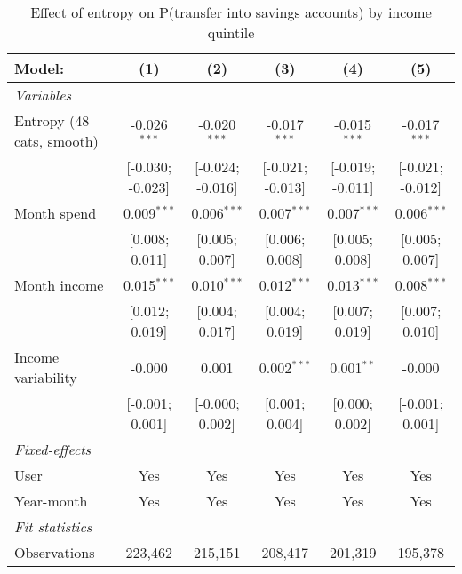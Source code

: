 
\begin{table}[htbp]
   \centering
   \tiny
   \begin{threeparttable}[b]
      \caption{\label{tab:reg_has_inflows_entropy_tag_spend_sz_quint} Effect of entropy on P(transfer into savings accounts) by income quintile}
      \begin{tabular}{lccccc}
         \tabularnewline \midrule \midrule
         Model:                    & (1)              & (2)              & (3)              & (4)              & (5)\\  
         \midrule
         \emph{Variables}\\
         Entropy (48 cats, smooth) & -0.026$^{***}$   & -0.020$^{***}$   & -0.017$^{***}$   & -0.015$^{***}$   & -0.017$^{***}$\\   
                                   & [-0.030; -0.023] & [-0.024; -0.016] & [-0.021; -0.013] & [-0.019; -0.011] & [-0.021; -0.012]\\   
         Month spend               & 0.009$^{***}$    & 0.006$^{***}$    & 0.007$^{***}$    & 0.007$^{***}$    & 0.006$^{***}$\\   
                                   & [0.008; 0.011]   & [0.005; 0.007]   & [0.006; 0.008]   & [0.005; 0.008]   & [0.005; 0.007]\\   
         Month income              & 0.015$^{***}$    & 0.010$^{***}$    & 0.012$^{***}$    & 0.013$^{***}$    & 0.008$^{***}$\\   
                                   & [0.012; 0.019]   & [0.004; 0.017]   & [0.004; 0.019]   & [0.007; 0.019]   & [0.007; 0.010]\\   
         Income variability        & -0.000           & 0.001            & 0.002$^{***}$    & 0.001$^{**}$     & -0.000\\   
                                   & [-0.001; 0.001]  & [-0.000; 0.002]  & [0.001; 0.004]   & [0.000; 0.002]   & [-0.001; 0.001]\\   
         \midrule
         \emph{Fixed-effects}\\
         User                      & Yes              & Yes              & Yes              & Yes              & Yes\\  
         Year-month                & Yes              & Yes              & Yes              & Yes              & Yes\\  
         \midrule
         \emph{Fit statistics}\\
         Observations              & 223,462          & 215,151          & 208,417          & 201,319          & 195,378\\  

\end{tabular}
\end{threeparttable}
\end{table}
